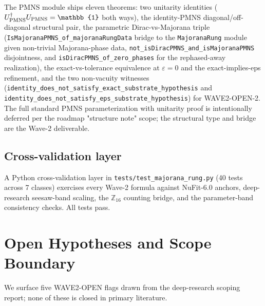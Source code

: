 \documentclass[aps,prd,twocolumn,showpacs,superscriptaddress,nofootinbib]{revtex4-2}
\newcommand{\PMNSMatrix}{U_{\rm PMNS}}
\begin{document}
The PMNS module ships eleven theorems: two unitarity identities
($\PMNSMatrix^\dagger \PMNSMatrix = \mathbb{1}$ both ways), the
identity-PMNS diagonal/off-diagonal structural pair, the parametric
Dirac-vs-Majorana triple
(\texttt{IsMajoranaPMNS\_of\_majoranaRungData} bridge to the
\texttt{MajoranaRung} module given non-trivial Majorana-phase data,
\texttt{not\_isDiracPMNS\_and\_isMajoranaPMNS} disjointness, and
\texttt{isDiracPMNS\_of\_zero\_phases} for the rephased-away
realization), the exact-vs-tolerance equivalence at $\varepsilon = 0$
and the exact-implies-eps refinement, and the two non-vacuity witnesses
(\texttt{identity\_does\_not\_satisfy\_exact\_substrate\_hypothesis} and
\texttt{identity\_does\_not\_satisfy\_eps\_substrate\_hypothesis})
for WAVE2-OPEN-2. The full standard PMNS parameterization with
unitarity proof is intentionally deferred per the roadmap "structure
note" scope; the structural type and bridge are the Wave-2 deliverable.

\subsection*{Cross-validation layer}

A Python cross-validation layer in
\texttt{tests/test\_majorana\_rung.py} (40 tests across 7 classes)
exercises every Wave-2 formula against NuFit-6.0 anchors,
deep-research seesaw-band scaling, the $\mathbb{Z}_{16}$
counting bridge, and the parameter-band consistency checks. All
tests pass.

\section{Open Hypotheses and Scope Boundary}
\label{sec:scope-boundary}

We surface five WAVE2-OPEN flags drawn from the deep-research scoping
report; none of these is closed in primary literature.
\end{document}
